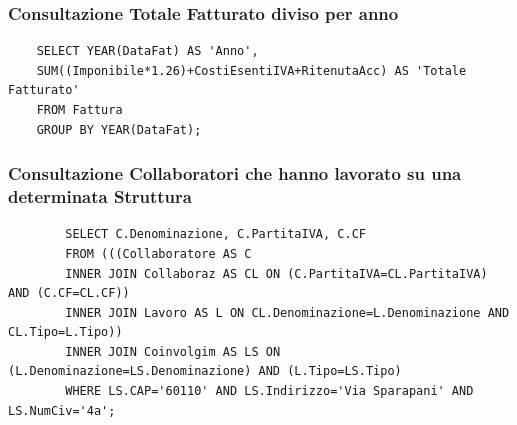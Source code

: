 \documentclass{elegantbook}
\begin{document}
\subsubsection{Consultazione Totale Fatturato diviso per anno}
\begin{verbatim}
	SELECT YEAR(DataFat) AS 'Anno', 
	SUM((Imponibile*1.26)+CostiEsentiIVA+RitenutaAcc) AS 'Totale Fatturato'
	FROM Fattura
	GROUP BY YEAR(DataFat);
\end{verbatim}
\begin{figure}[H]
	\centering
\end{figure}
\subsubsection{Consultazione Collaboratori che hanno lavorato su una determinata Struttura}
	\begin{verbatim}
		SELECT C.Denominazione, C.PartitaIVA, C.CF
		FROM (((Collaboratore AS C 
		INNER JOIN Collaboraz AS CL ON (C.PartitaIVA=CL.PartitaIVA) AND (C.CF=CL.CF))
		INNER JOIN Lavoro AS L ON CL.Denominazione=L.Denominazione AND CL.Tipo=L.Tipo))
		INNER JOIN Coinvolgim AS LS ON (L.Denominazione=LS.Denominazione) AND (L.Tipo=LS.Tipo)
		WHERE LS.CAP='60110' AND LS.Indirizzo='Via Sparapani' AND LS.NumCiv='4a';
	\end{verbatim}
\begin{figure}[H]
	\centering
\end{figure}
\end{document}
